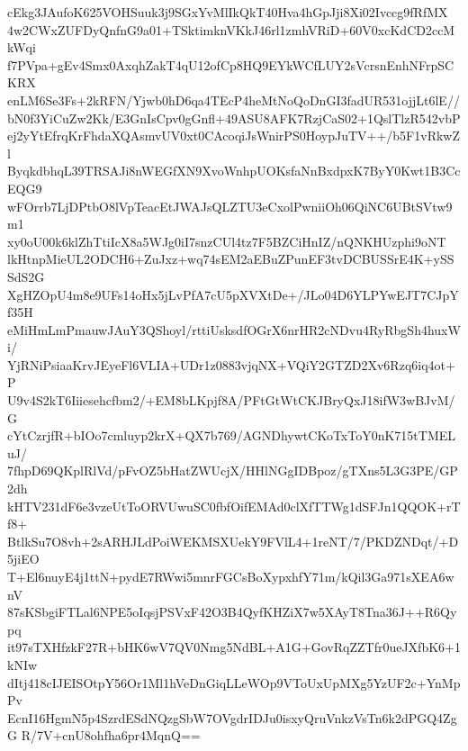 cEkg3JAufoK625VOHSuuk3j9SGxYvMlIkQkT40Hva4hGpJji8Xi02Ivccg9fRfMX
4w2CWxZUFDyQnfnG9a01+TSktimknVKkJ46rl1zmhVRiD+60V0xcKdCD2ccMkWqi
f7PVpa+gEv4Smx0AxqhZakT4qU12ofCp8HQ9EYkWCfLUY2sVcrsnEnhNFrpSCKRX
enLM6Se3Fs+2kRFN/Yjwb0hD6qa4TEcP4heMtNoQoDnGI3fadUR531ojjLt6lE//
bN0f3YiCuZw2Kk/E3GnIsCpv0gGnfl+49ASU8AFK7RzjCaS02+1QslTlzR542vbP
ej2yYtEfrqKrFhdaXQAsmvUV0xt0CAcoqiJsWnirPS0HoypJuTV++/b5F1vRkwZl
ByqkdbhqL39TRSAJi8nWEGfXN9XvoWnhpUOKsfaNnBxdpxK7ByY0Kwt1B3CcEQG9
wFOrrb7LjDPtbO8lVpTeacEtJWAJsQLZTU3eCxolPwniiOh06QiNC6UBtSVtw9m1
xy0oU00k6klZhTtiIcX8a5WJg0iI7snzCUl4tz7F5BZCiHnIZ/nQNKHUzphi9oNT
lkHtnpMieUL2ODCH6+ZuJxz+wq74sEM2aEBuZPunEF3tvDCBUSSrE4K+ySSSdS2G
XgHZOpU4m8e9UFs14oHx5jLvPfA7cU5pXVXtDe+/JLo04D6YLPYwEJT7CJpYf35H
eMiHmLmPmauwJAuY3QShoyl/rttiUsksdfOGrX6nrHR2cNDvu4RyRbgSh4huxWi/
YjRNiPsiaaKrvJEyeFl6VLIA+UDr1z0883vjqNX+VQiY2GTZD2Xv6Rzq6iq4ot+P
U9v4S2kT6Iiiesehcfbm2/+EM8bLKpjf8A/PFtGtWtCKJBryQxJ18ifW3wBJvM/G
cYtCzrjfR+bIOo7cmluyp2krX+QX7b769/AGNDhywtCKoTxToY0nK715tTMELuJ/
7fhpD69QKplRlVd/pFvOZ5bHatZWUcjX/HHlNGgIDBpoz/gTXns5L3G3PE/GP2dh
kHTV231dF6e3vzeUtToORVUwuSC0fbfOifEMAd0clXfTTWg1dSFJn1QQOK+rTf8+
BtlkSu7O8vh+2sARHJLdPoiWEKMSXUekY9FVlL4+1reNT/7/PKDZNDqt/+D5jiEO
T+El6nuyE4j1ttN+pydE7RWwi5mnrFGCsBoXypxhfY71m/kQil3Ga971sXEA6wnV
87sKSbgiFTLal6NPE5oIqsjPSVxF42O3B4QyfKHZiX7w5XAyT8Tna36J++R6Qypq
it97sTXHfzkF27R+bHK6wV7QV0Nmg5NdBL+A1G+GovRqZZTfr0ueJXfbK6+1kNIw
dItj418cIJEISOtpY56Or1Ml1hVeDnGiqLLeWOp9VToUxUpMXg5YzUF2c+YnMpPv
EcnI16HgmN5p4SzrdESdNQzgSbW7OVgdrIDJu0isxyQruVnkzVsTn6k2dPGQ4ZgG
R/7V+cnU8ohfha6pr4MqnQ==
